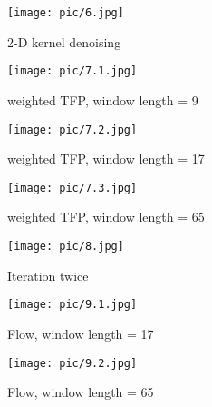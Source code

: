 \documentclass[10pt,twocolumn,letterpaper]{article}
\begin{document}
\begin{figure}[htp]
\texttt{[image: pic/6.jpg]}
\caption{2-D kernel denoising}

\texttt{[image: pic/7.1.jpg]}
\caption{weighted TFP, window length = 9}

\texttt{[image: pic/7.2.jpg]}
\caption{weighted TFP, window length = 17}

\texttt{[image: pic/7.3.jpg]}
\caption{weighted TFP, window length = 65}
\end{figure}

\begin{figure}[htp]
\texttt{[image: pic/8.jpg]}
\caption{Iteration twice}

\texttt{[image: pic/9.1.jpg]}
\caption{Flow, window length = 17}

\texttt{[image: pic/9.2.jpg]}
\caption{Flow, window length = 65}

\end{figure}
\end{document}
